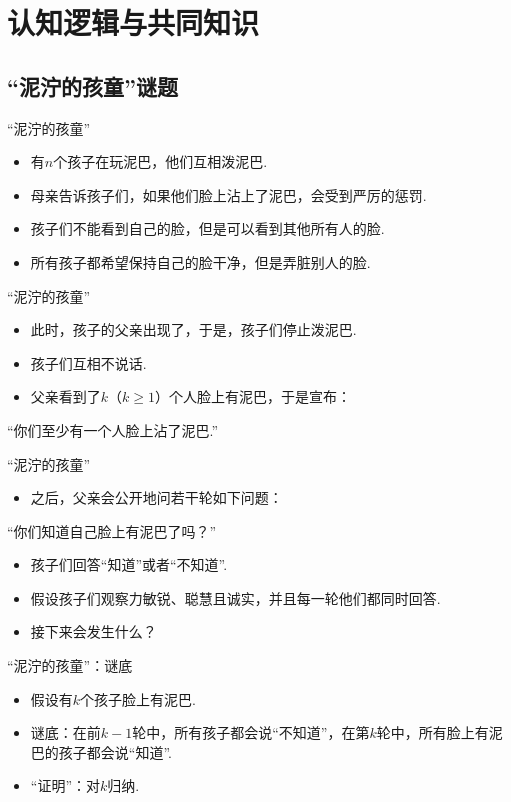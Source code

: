 \chapter{认知逻辑与共同知识}\label{chap:epistemic-logic}

\begingroup
\newcommand{\pref}{Chapters/epistemic-logic/figures}

\section{“泥泞的孩童”谜题}
{“泥泞的孩童”}
\begin{itemize}
    \item 有$n$个孩子在玩泥巴，他们互相泼泥巴.
    \item 母亲告诉孩子们，如果他们脸上沾上了泥巴，会受到严厉的惩罚.
    \item 孩子们不能看到自己的脸，但是可以看到其他所有人的脸.
    \item 所有孩子都希望保持自己的脸干净，但是弄脏别人的脸.
\end{itemize}

{“泥泞的孩童”}
\begin{itemize}
    \item 此时，孩子的父亲出现了，于是，孩子们停止泼泥巴.
    \item 孩子们互相不说话.
    \item 父亲看到了$k$（$k\geq 1$）个人脸上有泥巴，于是宣布：
\end{itemize}
    \begin{center}
        “你们至少有一个人脸上沾了泥巴.”
    \end{center}


{“泥泞的孩童”}
\begin{itemize}
    \item 之后，父亲会公开地问若干轮如下问题：
\end{itemize}
\begin{center}
    “你们知道自己脸上有泥巴了吗？”
\end{center}
\begin{itemize}
    \item 孩子们回答“知道”或者“不知道”.
    \item 假设孩子们观察力敏锐、聪慧且诚实，并且每一轮他们都同时回答.
    \item 接下来会发生什么？
\end{itemize}


{“泥泞的孩童”：谜底}
\begin{itemize}
    \item 假设有$k$个孩子脸上有泥巴.
    \item 谜底：在前$k-1$轮中，所有孩子都会说“不知道”，在第$k$轮中，所有脸上有泥巴的孩子都会说“知道”.
    \item “证明”：对$k$归纳.
\end{itemize}


